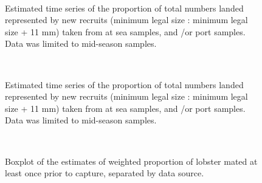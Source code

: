 \documentclass[11pt]{article}
\newcommand{\D}{.}
\newcommand{\e}{/backup/bio_data/bio.lobster/figures/} %
\begin{document}
\begin{landscape}
\begin{figure}
        \centering
         \\
                    
                    \caption{Estimated time series of the proportion of total numbers landed represented by new recruits (minimum legal size : minimum legal size + 11 mm) taken from at sea samples, and /or  port samples. Data was limited to mid-season samples.}
        \end{figure}

\begin{figure}
        \centering
         \\
                    
                    \caption{Estimated time series of the proportion of total numbers landed represented by new recruits (minimum legal size : minimum legal size + 11 mm) taken from at sea samples, and /or  port samples. Data was limited to mid-season samples.}
        \end{figure}

\end{landscape}


\begin{figure}
        \centering
         \\
                     \caption{Boxplot of the  estimates of weighted proportion of lobster mated at least once prior to capture, separated by data source.}
        \end{figure}
\end{document}
